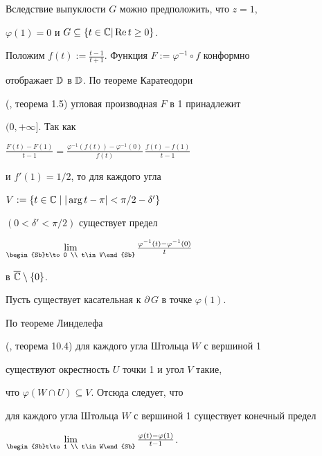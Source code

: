 \begin{pf} Вследствие выпуклости $G$ можно предположить, что $z=1$, 


$\varphi(1)=0$ и $G\subseteq\{t\in\Bbb C\vert\operatorname{Re} t\ge 0\}$. 


Положим $f(t):=\frac{t-1}{t+1}$. Функция $F:=\varphi^{-1}\circ f$ конформно 


отображает $\Bbb D$ в $\Bbb D$. По теореме Каратеодори 


(\cite{Ahl}, теорема 1.5) угловая производная $F$ в 1 принадлежит 


$(0,+\infty]$. Так как 


% 


$\frac{F(t)-F(1)}{t-1}=\frac{\varphi^{-1}(f(t))-\varphi^{-1}(0)}{f(t)} 


\,\frac{f(t)-f(1)}{t-1}$ 


%


и $f'(1)=1/2$, то для каждого угла 


$V:=\{t\in\Bbb C\mid |\arg t-\pi|<\pi/2-\delta'\}$ 


$(0<\delta'<\pi/2)$ существует предел 


$\lim\limits_{\begin{Sb}t\to 0 \\ t\in V\end{Sb}} 


\frac{\varphi^{-1}(t)-\varphi^{-1}(0)}{t}$ 


в $\overline{\Bbb C}\setminus\{0\}$. 


 


Пусть существует касательная к $\partial\, G$ в точке $\varphi(1)$. 


По теореме Линделефа 


(\cite{Pomm}, теорема 10.4) для каждого угла Штольца $W$ с вершиной 1 


существуют окрестность $U$ точки 1 и угол $V$ такие, 


что $\varphi(W\cap U)\subseteq V$. Отсюда следует, что 


для каждого угла Штольца $W$ с вершиной 1 существует конечный предел 


$\lim\limits_{\begin{Sb}t\to 1 \\ t\in W\end{Sb}} 


\frac{\varphi(t)-\varphi(1)}{t-1}$. 


 



\end{pf}
